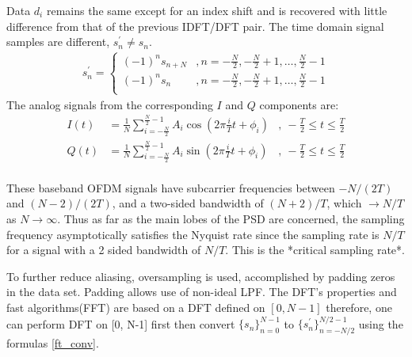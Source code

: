 Data $d_i$ remains the same except for an index shift and is recovered with little difference from that of the previous \gls{IDFT}/\gls{DFT} pair. The time domain signal samples are different, $s_n^\prime \neq s_n$.
\begin{align}
\label{ft_conv}
s_n^\prime = \begin{cases}
(-1)^ns_{n+N}&, n=-\frac{N}{2},-\frac{N}{2}+1,\ldots,\frac{N}{2}-1\\
(-1)^ns_n&, n=-\frac{N}{2},-\frac{N}{2}+1,\ldots,\frac{N}{2}-1\\
\end{cases}
\end{align}
The analog signals from the corresponding $I$ and $Q$ components are:
\begin{align*}
I(t) &= \frac{1}{N}\sum_{i=-\frac{N}{2}}^{\frac{N}{2}-1}A_i\cos\left( 2\pi\frac{i}{T}t+\phi_i\right)&,\ -\frac{T}{2}\leq t\leq \frac{T}{2}\\
Q(t) &= \frac{1}{N}\sum_{i=-\frac{N}{2}}^{\frac{N}{2}-1}A_i\sin\left( 2\pi\frac{i}{T}t+\phi_i\right)&,\ -\frac{T}{2}\leq t\leq \frac{T}{2}\\
\end{align*}

These baseband \gls{OFDM} signals have subcarrier frequencies between $-N/(2T)$ and $(N-2)/(2T)$, and a two-sided bandwidth of $(N+2)/T$, which $\to N/T$ as $N\to\infty$. Thus as far as the main lobes of the \gls{PSD} are concerned, the sampling frequency asymptotically satisfies the Nyquist rate since the sampling rate is $N/T$ for a signal with a 2 sided bandwidth of $N/T$. This is the *critical sampling rate*.

To further reduce aliasing, oversampling is used, accomplished by padding zeros in the data set. Padding allows use of non-ideal \gls{LPF}. The \gls{DFT}'s properties and fast algorithms(\gls{FFT}) are based on a \gls{DFT} defined on $[0, N-1]$ therefore, one can perform \gls{DFT} on [0, N-1] first then convert $\{ s_n\}^{N-1}_{n=0}$ to $\{s_n^\prime\}^{N/2-1}_{n=-N/2}$ using the formulas \eqref{ft_conv}.

